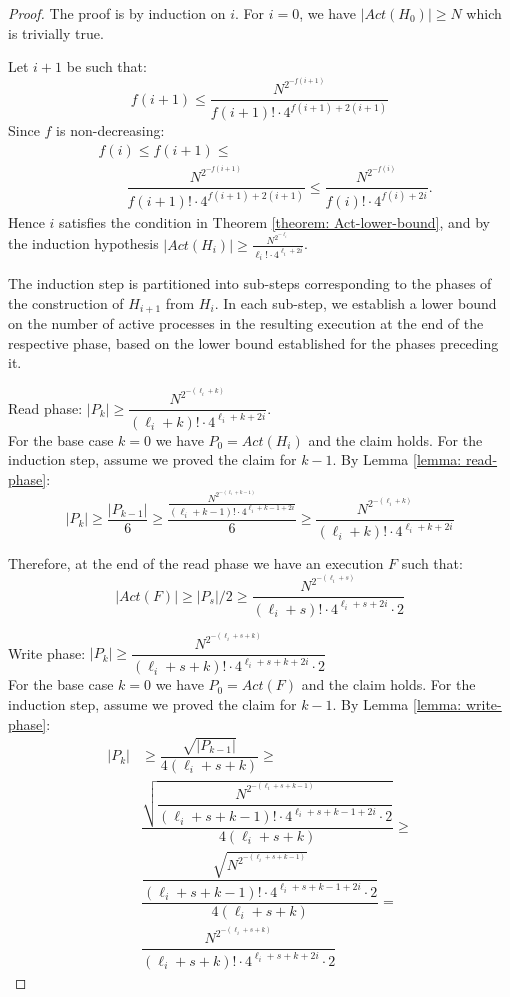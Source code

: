 \begin{proof}  \mbox{}
	
	The proof is by induction on $i$. For $i=0$, we have $|Act(H_0)| \geq N$ which is trivially true.

	Let $i+1$ be such that:
 	$$f(i+1) \leq \dfrac{N^{2^{-f(i+1)}}} {f(i+1)! \cdot 4^{f(i+1) + 2(i+1)}}$$
 	Since $f$ is non-decreasing:
	\begin{align*}
		& f(i) \leq f(i+1) \leq \\
		& \qquad \dfrac{N^{2^{-f(i+1)}}} {f(i+1)! \cdot 4^{f(i+1)+2(i+1)}} \leq \dfrac{N^{2^{-f(i)}}} {f(i)! \cdot 4^{f(i)+2i}}.
	\end{align*}
	Hence $i$ satisfies the condition in Theorem \ref{theorem: Act-lower-bound}, and by the induction hypothesis $|Act(H_i)| \geq \frac{N^{2^{-\ell_i}}}{\ell_i! \cdot 4^{\ell_i+2i}}$.
	
	The induction step is partitioned into sub-steps corresponding to the phases of the construction of $H_{i+1}$ from $H_i$. In each sub-step, we establish a lower bound on the number of active processes in the resulting execution at the end of the respective phase, based on the lower bound established for the phases preceding it.
	
	
	Read phase: $|P_k| \geq \dfrac{N^{2^{-(\ell_i+k)}}}{(\ell_i+k)! \cdot 4^{\ell_i+k+2i}}$.
	\\ For the base case $k=0$ we have $P_0 = Act(H_i)$ and the claim holds. For the induction step, assume we proved the claim for $k-1$. By Lemma \ref{lemma: read-phase}:
	$$ |P_k| \geq \dfrac{|P_{k-1}|}{6} \geq \dfrac{\frac{N^{2^{-(\ell_i+k-1)}}}{(\ell_i+k-1)! \cdot 4^{\ell_i+k-1+2i}}}{6}
	\geq \dfrac{N^{2^{-(\ell_i+k)}}}{(\ell_i+k)! \cdot 4^{\ell_i+k+2i}} $$
	
	Therefore, at the end of the read phase we have an execution $F$ such that:
	$$|Act(F)| \geq |P_s|/2 \geq \dfrac{N^{2^{-(\ell_i+s)}}}{(\ell_i+s)! \cdot 4^{\ell_i+s+2i} \cdot 2}$$
	
	
	Write phase: $|P_k| \geq \dfrac{N^{2^{-(\ell_i+s+k)}}}{(\ell_i+s+k)! \cdot 4^{\ell_i+s+k+2i} \cdot 2}$
	\\ For the base case $k=0$ we have $P_0 = Act(F)$ and the claim holds. For the induction step, assume we proved the claim for $k-1$. By Lemma \ref{lemma: write-phase}:
	\begin{align*}
	|P_k| &\geq \dfrac {\sqrt{|P_{k-1}|}} {4(\ell_i+s+k)} \geq \\
	& \dfrac {\sqrt{\dfrac{N^{2^{-(\ell_i+s+k-1)}}} {(\ell_i+s+k-1)! \cdot 4^{\ell_i+s+k-1+2i} \cdot 2}}} {4(\ell_i+s+k)} \geq \\
	& \dfrac {\dfrac{\sqrt{N^{2^{-(\ell_i+s+k-1)}}}} {(\ell_i+s+k-1)! \cdot 4^{\ell_i+s+k-1+2i} \cdot 2}} {4(\ell_i+s+k)} = \\
	& \dfrac{N^{2^{-(\ell_i+s+k)}}}{(\ell_i+s+k)! \cdot 4^{\ell_i+s+k+2i} \cdot 2}
	\end{align*}
	

\end{proof}
